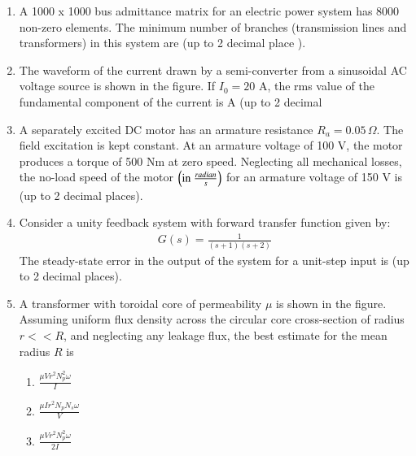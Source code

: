 \documentclass[journal]{IEEEtran}
\begin{document}
\begin{enumerate}
\item A 1000 x 1000 bus admittance matrix for an electric power system has 8000 non-zero elements. The minimum number of branches (transmission lines and transformers) in this system are  \underline{\hspace{1cm}} (up to 2 decimal place ).
\item The waveform of the current drawn by a semi-converter from a sinusoidal AC voltage source is shown in the figure. If $I_0 = 20$ A, the rms value of the fundamental component of the current is \underline{\hspace{1cm}} A (up to 2 decimal
    \begin{figure}[!ht]
    \centering
    \label{fig:power system network}
    \end{figure}
\item A separately excited DC motor has an armature resistance $R_a = 0.05 \, \Omega$. The field excitation is kept constant. At an armature voltage of 100 V, the motor produces a torque of 500 Nm at zero speed. Neglecting all mechanical losses, the no-load speed of the motor $\left(\text{in} \ \frac{radian}{s}\right)$ for an armature voltage of 150 V is \underline{\hspace{1cm}} (up to 2 decimal places).
\item Consider a unity feedback system with forward transfer function given by:
\begin{align}
G(s) = \frac{1}{(s+1)(s+2)}
\end{align}
The steady-state error in the output of the system for a unit-step input is \underline{\hspace{1cm}} (up to 2 decimal places).
\item A transformer with toroidal core of permeability $\mu$ is shown in the figure. Assuming uniform flux density across the circular core cross-section of radius $r << R$, and neglecting any leakage flux, the best estimate for the mean radius $R$ is
\begin{figure}[!ht]
    \centering
    \label{fig:power system network}
    \end{figure}
\begin{enumerate}
    \item $\frac{\mu V r^2 N_p^2 \omega}{I}$
    \item $\frac{\mu I r^2 N_p N_s \omega}{V}$
    \item $\frac{\mu V r^2 N_p^2 \omega}{2I}$

\end{enumerate}
\end{enumerate}
\end{document}
